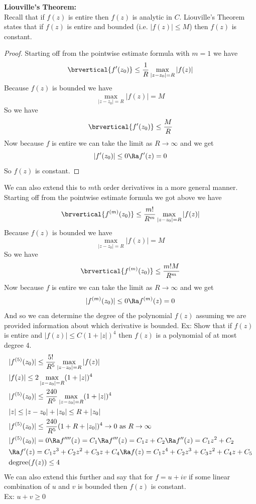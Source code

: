 \textbf{Liouville's Theorem:}\\
Recall that if $f(z)$ is entire then $f(z)$ is analytic in $C$. Liouville's Theorem states that if $f(z)$ is entire and bounded (i.e. $|f(z)|\leq M$) then $f(z)$ is constant.
\begin{proof}
Starting off from the pointwise estimate formula with $m=1$ we have
\[\brvertical{f'(z_0)}\leq\frac{1}{R}\max_{|z-z_0|=R}|f(z)|\]
Because $f(z)$ is bounded we have
\[\max_{|z-z_0|=R}|f(z)|=M\]
So we have
\[\brvertical{f'(z_0)}\leq\frac{M}{R}\]
Now because $f$ is entire we can take the limit as $R\to\infty$ and we get
\[|f'(z_0)|\leq 0\Ra f'(z)=0\]
So $f(z)$ is constant.
\end{proof}
We can also extend this to $m$th order derivatives in a more general manner.\\
Starting off from the pointwise estimate formula we got above we have
\[\brvertical{f^{(m)}(z_0)}\leq\frac{m!}{R^m}\max_{|z-z_0|=R}|f(z)|\]
Because $f(z)$ is bounded we have
\[\max_{|z-z_0|=R}|f(z)|=M\]
So we have
\[\brvertical{f^{(m)}(z_0)}\leq\frac{m!M}{R^m}\]
Now because $f$ is entire we can take the limit as $R\to\infty$ and we get
\[|f^{(m)}(z_0)|\leq 0\Ra f^{(m)}(z)=0\]
And so we can determine the degree of the polynomial $f(z)$ assuming we are provided information about which derivative is bounded.
Ex: Show that if $f(z)$ is entire and $|f(z)|\leq C(1+|z|)^4$ then $f(z)$ is a polynomial of at most degree 4.
\begin{align*}
    &|f^{(5)}(z_0)|\leq\frac{5!}{R^5}\max_{|z-z_0|=R}|f(z)|\\
    &|f(z)|\leq 2\max_{|z-z_0|=R}(1+|z|)^4\\
    &|f^{(5)}(z_0)|\leq\frac{240}{R^5}\max_{|z-z_0|=R}(1+|z|)^4\\
    &|z|\leq|z-z_0|+|z_0|\leq R+|z_0|\\
    &|f^{(5)}(z_0)|\leq\frac{240}{R^5}(1+R+|z_0|)^4\to0\text{ as }R\to\infty\\
    &|f^{(5)}(z_0)|=0\Ra f''''(z)=C_1\Ra f'''(z)=C_1z+C_2\Ra f''(z)=C_1z^2+C_2\\
    &\Ra f'(z)=C_1z^3+C_2z^2+C_3z+C_4\Ra f(z)=C_1z^4+C_2z^3+C_3z^2+C_4z+C_5\\
    &\mathrm{degree}(f(z))\leq 4
\end{align*}
We can also extend this further and say that for $f=u+iv$ if some linear combination of $u$ and $v$ is bounded then $f(z)$ is constant.\\
Ex: $u+v\geq 0$
